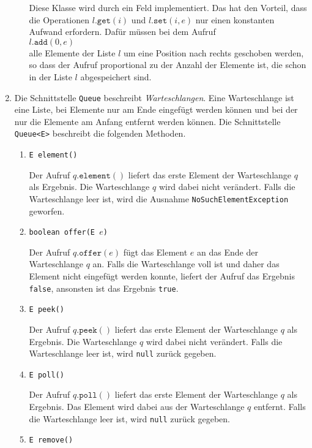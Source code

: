 \begin{enumerate}
\begin{enumerate}
            Diese Klasse wird durch ein Feld implementiert.  Das hat den Vorteil, dass die
            Operationen  $l.\mathtt{get}(i)$ und $l.\mathtt{set}(i,e)$ nur einen
            konstanten Aufwand erfordern.  Daf\"ur m\"ussen bei dem Aufruf 
            \\[0.2cm]
            \hspace*{1.3cm}
            $l.\mathtt{add}(0,e)$
            \\[0.2cm]
            alle Elemente der Liste $l$ um eine Position nach rechts geschoben werden, so
            dass der Aufruf proportional zu der Anzahl der Elemente ist, die schon in der
            Liste $l$ abgespeichert sind.
      \end{enumerate}
\item Die Schnittstelle \texttt{Queue} beschreibt \emph{Warteschlangen}.  
      Eine Warteschlange ist eine Liste, bei Elemente nur am Ende eingef\"ugt werden k\"onnen
      und bei der nur die Elemente am Anfang entfernt werden k\"onnen.
      Die Schnittstelle \texttt{Queue<E>} beschreibt die folgenden Methoden.
      \begin{enumerate}
      \item \texttt{E element()}
        
            Der Aufruf $q.\mathtt{element}()$ liefert das erste Element der Warteschlange $q$ als
            Ergebnis.  Die Warteschlange $q$ wird dabei nicht ver\"andert.  Falls die
            Warteschlange leer ist, wird die Ausnahme \texttt{NoSuchElementException} geworfen.
      \item \texttt{boolean offer(E $e$)}

            Der Aufruf $q.\mathtt{offer}(e)$ f\"ugt das Element $e$ an das Ende der
            Warteschlange $q$ an.  Falls die Warteschlange voll ist und daher das Element
            nicht eingef\"ugt werden konnte, liefert der Aufruf das
            Ergebnis \texttt{false}, ansonsten ist das Ergebnis \texttt{true}.
      \item \texttt{E peek()}

            Der Aufruf $q.\mathtt{peek}()$ liefert das erste Element der Warteschlange $q$ als
            Ergebnis.  Die Warteschlange $q$ wird dabei nicht ver\"andert.  Falls die
            Warteschlange leer ist, wird \texttt{null} zur\"uck gegeben.
      \item \texttt{E poll()}

            Der Aufruf $q.\mathtt{poll}()$ liefert das erste Element der Warteschlange $q$ als
            Ergebnis.  Das Element wird dabei aus der Warteschlange $q$ entfernt.  Falls die
            Warteschlange leer ist, wird \texttt{null} zur\"uck gegeben.
      \item \texttt{E remove()}


\end{enumerate}
\end{enumerate}
